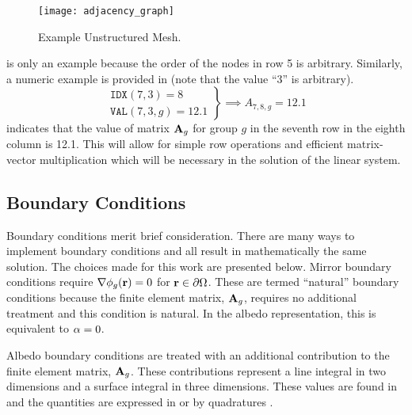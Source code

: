     \begin{figure}
      \centering
      \texttt{[image: adjacency\_graph]}
      \caption{Example Unstructured Mesh.}
      \label{fig:adjacency_graph}
    \end{figure}

     is only an example because the order of the nodes in 
    row 5 is arbitrary. Similarly, a numeric example is provided in 
     (note that the value ``3'' is arbitrary).
    \begin{equation}
      \label{eq:idx_number}
      \left.
      \begin{array}{c}
        \texttt{IDX}(7,3) = 8 \\
        \texttt{VAL}(7,3,g) = 12.1
      \end{array}
      \right\}
      \implies
      A_{7,8,g} = 12.1
    \end{equation}
     indicates that the value of matrix $\mathbf{A}_g$ for group
    $g$ in the seventh row in the eighth column is 12.1. This will allow for 
    simple row operations and efficient matrix-vector multiplication which will
    be necessary in the solution of the linear system.

  \subsection{Boundary Conditions}
    \label{sec:boundary_conditions}
    Boundary conditions merit brief consideration. There are many ways to 
    implement boundary conditions and all result in mathematically the same 
    solution. The choices made for this work are presented below. Mirror 
    boundary conditions require $\mathbf{\nabla} \phi_g(\mathbf{r}) = 0$ for 
    $\mathbf{r} \in \partial \Omega$. These are termed ``natural'' boundary
    conditions because the finite element matrix, $\mathbf{A}_g$, requires no
    additional treatment and this condition is natural. In the albedo
    representation, this is equivalent to $\alpha = 0$.
    
    Albedo boundary conditions are treated with an additional contribution to 
    the finite element matrix, $\mathbf{A}_g$. These contributions represent a line 
    integral in two dimensions and a surface integral in three dimensions. These
    values are found in  and the quantities are 
    expressed in  or by quadratures 
    .
    
